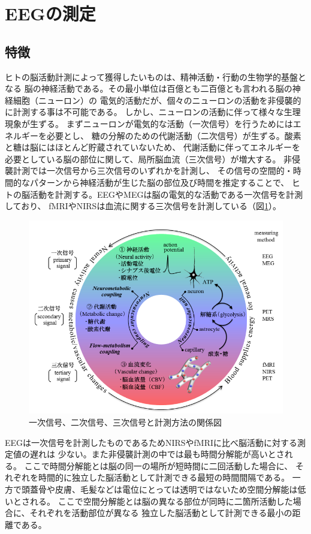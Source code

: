 \section{\mc EEGの測定}
\subsection{特徴}
ヒトの脳活動計測によって獲得したいものは、精神活動・行動の生物学的基盤となる
脳の神経活動である。その最小単位は百億とも二百億とも言われる脳の神経細胞（ニューロン）の
電気的活動だが、個々のニューロンの活動を非侵襲的に計測する事は不可能である。
しかし、ニューロンの活動に伴って様々な生理現象が生ずる。
まずニューロンが電気的な活動（一次信号）を行うためにはエネルギーを必要とし、
糖の分解のための代謝活動（二次信号）が生ずる。酸素と糖は脳にはほとんど貯蔵されていないため、
代謝活動に伴ってエネルギーを必要としている脳の部位に関して、局所脳血流（三次信号）が増大する。
非侵襲計測では一次信号から三次信号のいずれかを計測し、
その信号の空間的・時間的なパターンから神経活動が生じた脳の部位及び時間を推定することで、
ヒトの脳活動を計測する。EEGやMEGは脳の電気的な活動である一次信号を計測しており、
fMRIやNIRSは血流に関する三次信号を計測している（図\ref{fig:信号フロー}\cite{脳を測る}）。
\begin{figure}
    \centering
    \includegraphics[width=15cm]{images/signalflow.png}
    \caption{一次信号、二次信号、三次信号と計測方法の関係図\cite{脳を測る}}
    \label{fig:信号フロー}
\end{figure}

EEGは一次信号を計測したものであるためNIRSやfMRIに比べ脳活動に対する測定値の遅れは
少ない。また非侵襲計測の中では最も時間分解能が高いとされる。
ここで時間分解能とは脳の同一の場所が短時間に二回活動した場合に、
それぞれを時間的に独立した脳活動として計測できる最短の時間間隔である。
一方で頭蓋骨や皮膚、毛髪などは電位にとっては透明ではないため空間分解能は低いとされる。
ここで空間分解能とは脳の異なる部位が同時に二箇所活動した場合に、それぞれを活動部位が異なる
独立した脳活動として計測できる最小の距離である。


